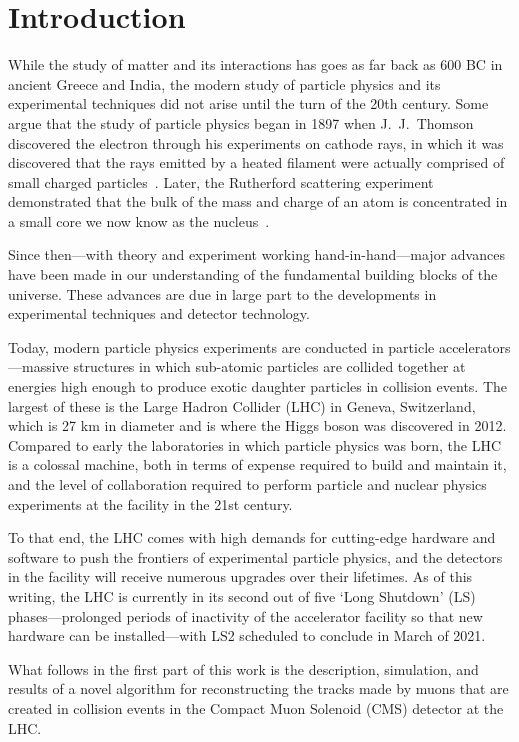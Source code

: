 
\chapter{Introduction}
While the study of matter and its interactions has goes as far back as 600 BC in ancient Greece and India, the modern study of particle physics and its experimental techniques did not arise until the turn of the 20th century.
Some argue that the study of particle physics began in 1897 when J.\ J.\ Thomson discovered the electron through his experiments on cathode rays, in which it was discovered that the rays emitted by a heated filament were actually comprised of small charged particles~\cite{GriffithsParticle}.
Later, the Rutherford scattering experiment demonstrated that the bulk of the mass and charge of an atom is concentrated in a small core we now know as the nucleus~\cite{BargerCollider}.

Since then---with theory and experiment working hand-in-hand---major advances have been made in our understanding of the fundamental building blocks of the universe.
These advances are due in large part to the developments in experimental techniques and detector technology.

Today, modern particle physics experiments are conducted in particle accelerators---massive structures in which sub-atomic particles are collided together at energies high enough to produce exotic daughter particles in collision events.
The largest of these is the Large Hadron Collider (LHC) in Geneva, Switzerland, which is 27 km in diameter and is where the Higgs boson was discovered in 2012.
Compared to early the laboratories in which particle physics was born, the LHC is a colossal machine, both in terms of expense required to build and maintain it, and the level of collaboration required to perform particle and nuclear physics experiments at the facility in the 21st century.

To that end, the LHC comes with high demands for cutting-edge hardware and software to push the frontiers of experimental particle physics, and the detectors in the facility will receive numerous upgrades over their lifetimes. As of this writing, the LHC is currently in its second out of five `Long Shutdown' (LS) phases---prolonged periods of inactivity of the accelerator facility so that new hardware can be installed---with LS2 scheduled to conclude in March of 2021.

What follows in the first part of this work is the description, simulation, and results of a novel algorithm for reconstructing the tracks made by muons that are created in collision events in the Compact Muon Solenoid (CMS) detector at the LHC.
